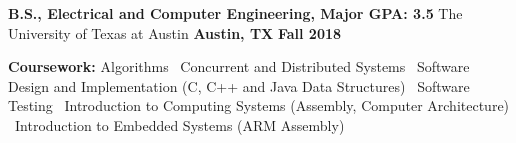 \begin{cventries}
  \cventry
    {\textbf{\normalsize B.S., Electrical and Computer Engineering, Major GPA: \large 3.5}}
    {\large The University of Texas at Austin}
    {\normalsize \textbf{Austin, TX}}
    {\normalsize \textbf{Fall 2018}}
    {
      \begin{cvitems}
        \item {\normalsize \textbf{Coursework:} Algorithms {\LARGE\textbullet }\ Concurrent and Distributed Systems {\LARGE\textbullet }\ Software Design and Implementation (C, C++ and Java Data Structures) {\LARGE\textbullet }\ Software Testing {\LARGE\textbullet }\ Introduction to Computing Systems (Assembly, Computer Architecture) \\{\LARGE\textbullet }\ Introduction to Embedded Systems (ARM Assembly)}
      \end{cvitems}
    }
\end{cventries}
